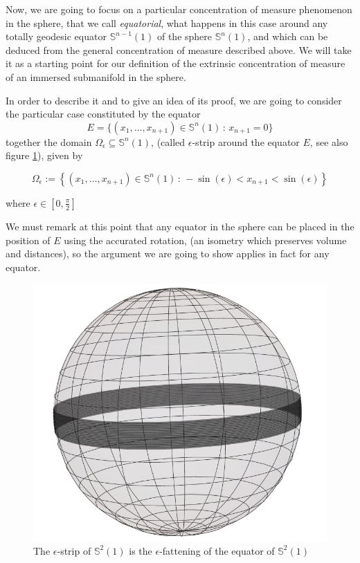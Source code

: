 \documentclass{amsart}
\theoremstyle{definition}
\theoremstyle{remark}
\begin{document}
Now, we are going to focus on a particular concentration of measure phenomenon in the sphere, that we call {\em equatorial}, what happens in this case around any totally geodesic equator $\mathbb{S}^{n-1}(1)$ of the sphere $ \mathbb{S}^{n}(1)$, and which can be deduced from the general concentration of measure described above. We will take  it as  a starting point for our definition of the extrinsic concentration of measure of an immersed submanifold in the sphere.

In order to describe it and to give an idea of its proof, we are going to consider the particular case constituted by the equator 
$$E=\{(x_1,\ldots,x_{n+1})\in \mathbb{S}^{n}(1)\, :\, x_{n+1}=0\}$$
together the domain $\Omega_\epsilon \subseteq  \mathbb{S}^{n}(1) $, (called $\epsilon$-strip around the equator $E$, see also figure \ref{fig:e-strip}), given by

\begin{equation*}
\Omega_\epsilon:=\left\lbrace  (x_1,\ldots,x_{n+1})\in \mathbb{S}^{n}(1)\, :\, -\sin(\epsilon)<x_{n+1}<\sin(\epsilon)\right\rbrace
\end{equation*}

\noindent where $\epsilon \in [0,\frac{\pi}{2}]$

We must remark at this point that any equator in the sphere can be placed in the position of $E$ using the accurated rotation, (an isometry which preserves volume and distances), so the argument we are going to show applies in fact for any equator.


\begin{center}
\begin{figure}\label{fig:e-strip}
    \centering
    \includegraphics[scale=0.35]{banda}
    \caption{The $\epsilon$-strip of $\mathbb{S}^2(1)$ is the $\epsilon$-fattening of the equator of $\mathbb{S}^2(1)$}
\end{figure}
\end{center}
\end{document}
